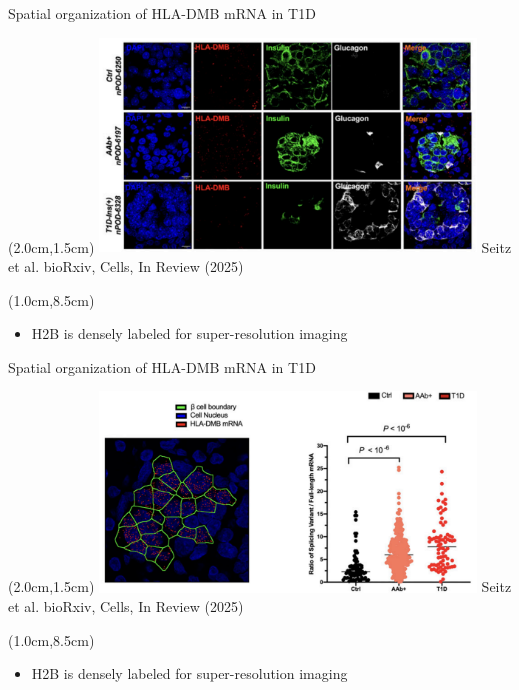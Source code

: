 \documentclass{beamer}					%
\begin{document}
\begin{frame}{Spatial organization of HLA-DMB mRNA in T1D}
\begin{textblock*}{10cm}(2.0cm,1.5cm)
\includegraphics[width=10cm]{../../postdoc/spatial/media/HLA-DMB-2.png}
Seitz et al. bioRxiv, Cells, In Review (2025)
\end{textblock*}

\begin{textblock*}{13cm}(1.0cm,8.5cm)
\begin{itemize}
\item H2B is densely labeled for super-resolution imaging
\end{itemize}
\end{textblock*}
\end{frame}

\begin{frame}{Spatial organization of HLA-DMB mRNA in T1D}
\begin{textblock*}{10cm}(2.0cm,1.5cm)
\includegraphics[width=10cm]{../../postdoc/spatial/media/HLA-DMB.png}
Seitz et al. bioRxiv, Cells, In Review (2025)
\end{textblock*}

\begin{textblock*}{13cm}(1.0cm,8.5cm)
\begin{itemize}
\item H2B is densely labeled for super-resolution imaging
\end{itemize}
\end{textblock*}
\end{frame}
\end{document}
